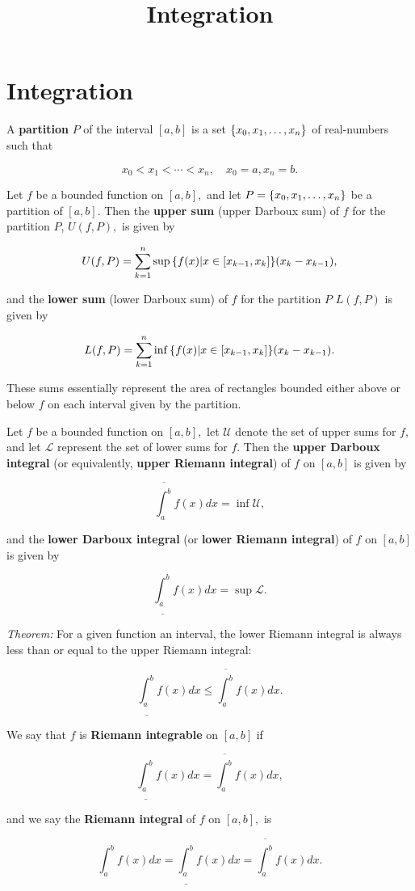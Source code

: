 \documentclass{article}
\title{Integration}
\begin{document}
\section{Integration}

A \textbf{partition} $P$ of the \@{interval} $[a,b]$ is a set $\left\{ x_0, x_1, \dots, x_n \right\}$ of \@{real-numbers} such that

\[ x_0 <  x_1 < \cdots < x_n, \quad x_0 = a, x_n = b. \]

Let $f$ be a bounded function on $[a,b],$ and let $P = \left\{ x_0, x_1, \dots, x_n \right\}$ be a partition of $[a,b].$ Then the \textbf{upper sum} (upper Darboux sum) of $f$ for the partition $P$, $U(f,P),$ is given by

\[ U(f, P) = \sum_{k=1}^n \sup{\left\{ f(x) | x \in [x_{k-1}, x_k] \right\}} (x_k - x_{k-1}), \]

and the \textbf{lower sum} (lower Darboux sum) of $f$ for the partition $P$ $L(f,P)$ is given by

\[ L(f, P) = \sum_{k=1}^n \inf{\left\{ f(x) | x \in [x_{k-1}, x_k] \right\}} (x_k - x_{k-1}). \]

These sums essentially represent the area of rectangles bounded either above or below $f$ on each interval given by the partition.

Let $f$ be a bounded function on $[a,b],$ let $\mathcal{U}$ denote the set of upper sums for $f,$ and let $\mathcal{L}$ represent the set of lower sums for $f.$ Then the \textbf{upper Darboux integral} (or equivalently, \textbf{upper Riemann integral}) of $f$ on $[a,b]$ is given by

\[ \overline{\int_a^{b}} f(x) dx = \inf \mathcal{U}, \]

and the \textbf{lower Darboux integral} (or \textbf{lower Riemann integral}) of $f$ on $[a,b]$ is given by

\[ \underline{\int_a^{b}} f(x) dx = \sup \mathcal{L}. \]

\emph{Theorem:} For a given function an interval, the lower Riemann integral is always less than or equal to the upper Riemann integral: 

\[ \underline{\int_a^{b}} f(x) dx  \leq \overline{\int_a^{b}} f(x) dx. \]

We say that $f$ is \textbf{Riemann integrable} on $[a,b]$ if 

\[ \underline{\int_a^{b}} f(x) dx = \overline{\int_a^{b}} f(x) dx, \]

and we say the \textbf{Riemann integral} of $f$ on $[a,b],$ is

\[ \int_a^{b} f(x) dx = \underline{\int_a^{b}} f(x) dx = \overline{\int_a^{b}} f(x) dx. \]
\end{document}
